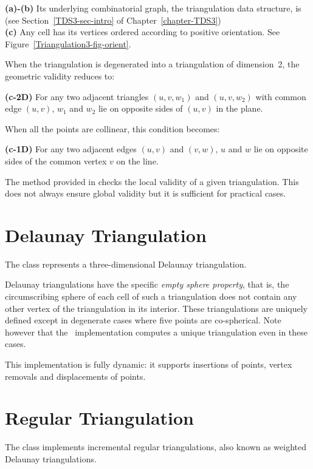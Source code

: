 {\bf (a)-(b)} Its underlying combinatorial graph, the triangulation
data structure, is  
(see Section~\ref{TDS3-sec-intro} of Chapter~\ref{chapter-TDS3})\\
{\bf (c)} Any cell has its vertices ordered according to positive
orientation. See Figure~\ref{Triangulation3-fig-orient}.

When the triangulation is degenerated into a triangulation of
dimension~2, the  geometric validity reduces to:

{\bf (c-2D)} For any two adjacent triangles $(u,v,w_1)$ and $(u,v,w_2)$ with
common edge $(u,v)$, $w_1$ and $w_2$ lie on opposite sides of $(u,v)$
in the plane.

When all the points are collinear, this condition becomes:

{\bf (c-1D)} For any two adjacent edges $(u,v)$ and $(v,w)$, $u$ and
$w$ lie on opposite sides of the common vertex $v$ on the line.

The  method provided in  checks
the local validity of a given triangulation. This does not always
ensure global validity \cite{mnssssu-cgpvg-96,dlpt-ccpps-98} but it is 
sufficient for practical cases.


\section{Delaunay Triangulation} 

The class  represents a three-dimensional
Delaunay triangulation.

Delaunay triangulations have the specific \textit{empty sphere property},
that is, the circumscribing sphere of each cell of such a triangulation
does not contain any other vertex of the triangulation in its interior.
These triangulations are uniquely defined except in degenerate cases
where five points are co-spherical.  Note however that the \cgal\ implementation
computes a unique triangulation even in these cases.

This implementation is fully dynamic: it supports insertions of points, vertex removals
and displacements of points.


\section{Regular Triangulation\label{Triangulation3-sec-class-Regulartriangulation}}

The class  implements incremental regular
triangulations, also known as weighted Delaunay triangulations.

